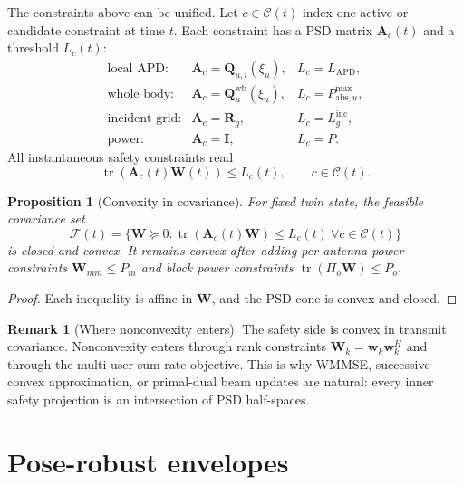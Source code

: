 \documentclass[11pt,a4paper]{article}
\theoremstyle{definition}
\newtheorem{remark}[definition]{Remark}
\theoremstyle{plain}
\newtheorem{proposition}[definition]{Proposition}
\newcommand{\ww}{\mathbf w}
\newcommand{\W}{\mathbf W}
\newcommand{\Q}{\mathbf Q}
\newcommand{\A}{\mathbf A}
\newcommand{\R}{\mathbf R}
\newcommand{\Id}{\mathbf I}
\newcommand{\APD}{\mathrm{APD}}
\newcommand{\Constraints}{\mathcal C}
\newcommand{\tr}{\operatorname{tr}}
\begin{document}
The constraints above can be unified.  Let $c\in\Constraints(t)$ index
one active or candidate constraint at time $t$.  Each constraint has
a PSD matrix $\A_c(t)$ and a threshold $L_c(t)$:
\begin{equation}\label{eq:constraint-dict}
\begin{array}{lll}
\text{local APD:} & \A_c=\Q_{u,i}(\xi_u), & L_c=L_{\APD},\\[0.25em]
\text{whole body:} & \A_c=\Q_u^{\mathrm{wb}}(\xi_u), & L_c=P_{\mathrm{abs},u}^{\max},\\[0.25em]
\text{incident grid:} & \A_c=\R_g, & L_c=L_g^{\mathrm{inc}},\\[0.25em]
\text{power:} & \A_c=\Id, & L_c=P.
\end{array}
\end{equation}
All instantaneous safety constraints read
\begin{equation}\label{eq:linear-W-constraint}
  \tr(\A_c(t)\W(t))\le L_c(t),
  \qquad c\in\Constraints(t).
\end{equation}

\begin{proposition}[Convexity in covariance]\label{prop:convex}
For fixed twin state, the feasible covariance set
\begin{equation}
  \mathcal F(t)=
  \{\W\succeq0:\tr(\A_c(t)\W)\le L_c(t)\ \forall c\in\Constraints(t)\}
\end{equation}
is closed and convex.  It remains convex after adding per-antenna power
constraints $\W_{mm}\le P_m$ and block power constraints
$\tr(\Pi_o\W)\le P_o$.
\end{proposition}

\begin{proof}
Each inequality is affine in $\W$, and the PSD cone is convex and closed.
\end{proof}

\begin{remark}[Where nonconvexity enters]
The safety side is convex in transmit covariance.  Nonconvexity enters
through rank constraints $\W_k=\ww_k\ww_k^H$ and through the multi-user
sum-rate objective.  This is why WMMSE, successive convex approximation,
or primal-dual beam updates are natural: every inner safety projection is
an intersection of PSD half-spaces.
\end{remark}

\section{Pose-robust envelopes}
\end{document}
